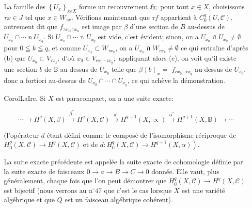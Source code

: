 La famille des $\left\{U_{x}\right\}_{x e X}$ forme un recouvrement $\mathfrak{H} ;$ pour tout $x \in X$, choisissons $\tau x \in J$ tel que $x \in W_{\tau x}$. Vérifions maintenant que $\tau f$ appartient à $C_{0}^{q}(U, \mathcal{C})$, autrement dit que $f_{\tau x_{0}, \tau x_{n}}$ est image par $\beta$ d'une section de $B$ au-dessus de $U_{x_{0}} \cap \cdots \operatorname{n} U_{x_{q}} .$ Si $U_{x_{0}} \cap \cdots$ n $U_{x_{q}}$ est vide, c'est évident; sinon, on a $U_{x_{0}}$ ก $U_{x_{k}} \neq \emptyset$ pour $0 \leqq k \leqq q$, et comme $U_{x_{k}} \subset W_{\tau x_{k}}$, on a $U_{x_{0}}$ ก $W_{\tau x_{k}} \neq \emptyset$ ce qui entraîne d'après (b) que $U_{x_{0}} \subset V_{\tau x_{k}}$, d'où $x_{0} \in V_{r x_{0} \cdots \tau x_{g}} ;$ appliquant alors (c), on voit qu'il existe une section $b$ de $\mathbb{B}$ au-dessus de $U_{x_{0}}$ telle que $\beta(b)_{x}=$ $f_{r x_{0} \cdots r x_{q}}$ au-dessus de $U_{x_{0}}$, donc a fortiori au-dessus de $U_{x_{0}} \cap \cdots \cap U_{x_{q}}$, ce qui achève la démonstration.

CorolLaIre. Si $X$ est paracompact, on a une suite exacte:

$$
\cdots \rightarrow H^{q}(X, \beta) \stackrel{\beta^{*}}{\rightarrow} H^{q}(X, \mathcal{C}) \stackrel{d}{\rightarrow} H^{q+1}(X, \propto) \stackrel{\alpha^{*}}{\rightarrow} H^{q+1}(X, \mathbb{B}) \rightarrow \cdots
$$

(l'opérateur $d$ étant défini comme le composé de l'isomorphisme réciproque de $H_{0}^{q}(X, \mathcal{C}) \rightarrow H^{q}(X, \mathcal{C})$ et de $\left.d: H_{0}^{q}(X, \mathcal{C}) \rightarrow H^{q+1}(X, \alpha)\right) .$

La suite exacte précédente est appelée la suite exacte de cohomologie définie par la suite exacte de faisceaux $0 \rightarrow a \rightarrow B \rightarrow C \rightarrow 0$ donnée. Elle vaut, plus généralement, chaque fois que l'on peut démontrer que $H_{0}^{q}(X, \mathcal{C}) \rightarrow H^{q}(X, \mathcal{C})$ est bijectif (nous verrons au $\mathrm{n}^{\circ} 47$ que c'est le cas lorsque $X$ est une variété algébrique et que $Q$ est un faisceau algébrique cohérent).

